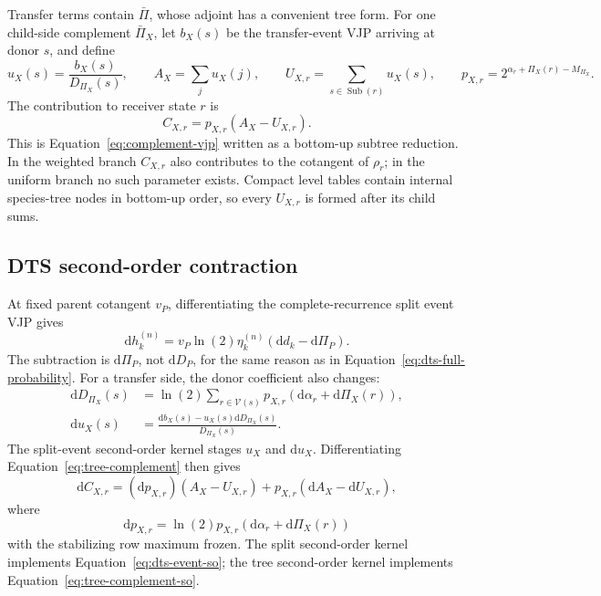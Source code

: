 \documentclass[11pt]{article}
\newcommand{\Sub}{\operatorname{Sub}}
\newcommand{\dd}{\mathrm{d}}
\begin{document}
Transfer terms contain $\bar\Pi$, whose adjoint has a convenient tree form.
For one child-side complement $\bar\Pi_X$, let $b_X(s)$ be the transfer-event
VJP arriving at donor $s$, and define
\begin{equation}
  u_X(s)=\frac{b_X(s)}{D_{\Pi_X}(s)},\qquad
  A_X=\sum_j u_X(j), \qquad
  U_{X,r}=\sum_{s\in\Sub(r)}u_X(s), \qquad
  p_{X,r}=2^{\alpha_r+\Pi_X(r)-M_{\Pi_X}}.
\end{equation}
The contribution to receiver state $r$ is
\begin{equation}
  C_{X,r}=p_{X,r}(A_X-U_{X,r}).
  \label{eq:tree-complement}
\end{equation}
This is Equation~\eqref{eq:complement-vjp} written as a bottom-up subtree
reduction.  In the weighted branch $C_{X,r}$ also contributes to the cotangent of
$\rho_r$; in the uniform branch no such parameter exists.
Compact level tables contain internal species-tree nodes in bottom-up order,
so every $U_{X,r}$ is formed after its child sums.

\subsection{DTS second-order contraction}

At fixed parent cotangent $v_P$, differentiating the complete-recurrence split
event VJP gives
\begin{equation}
  \dd h_k^{(n)}=v_P\ln(2)\eta_k^{(n)}
  (\dd d_k-\dd\Pi_P).
  \label{eq:dts-event-so}
\end{equation}
The subtraction is $\dd\Pi_P$, not $\dd D_P$, for the same reason as in
Equation~\eqref{eq:dts-full-probability}.
For a transfer side, the donor coefficient also changes:
\begin{align}
  \dd D_{\Pi_X}(s)
    &=\ln(2)\sum_{r\in\mathcal V(s)}p_{X,r}
      (\dd\alpha_r+\dd\Pi_X(r)),\\
  \dd u_X(s)
    &=\frac{\dd b_X(s)-u_X(s)\dd D_{\Pi_X}(s)}{D_{\Pi_X}(s)}.
  \label{eq:dts-donor-so}
\end{align}
The split-event second-order kernel stages $u_X$ and $\dd u_X$.
Differentiating Equation~\eqref{eq:tree-complement} then gives
\begin{equation}
  \dd C_{X,r}=(\dd p_{X,r})(A_X-U_{X,r})
    +p_{X,r}(\dd A_X-\dd U_{X,r}),
  \label{eq:tree-complement-so}
\end{equation}
where
\begin{equation}
  \dd p_{X,r}=\ln(2)p_{X,r}
    (\dd\alpha_r+\dd\Pi_X(r))
\end{equation}
with the stabilizing row maximum frozen.  The split second-order kernel
implements Equation~\eqref{eq:dts-event-so}; the tree second-order kernel
implements Equation~\eqref{eq:tree-complement-so}.
\end{document}
